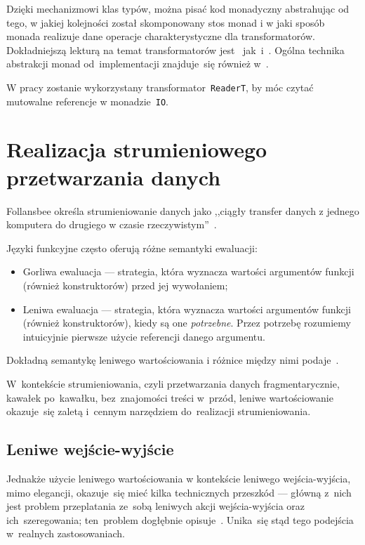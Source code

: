 \documentclass[../../praca.tex]{subfiles}
\begin{document}
Dzięki mechanizmowi klas typów, można pisać kod monadyczny abstrahując od tego,
w jakiej kolejności został skomponowany stos monad i w jaki sposób monada
realizuje dane operacje charakterystyczne dla transformatorów. 
Dokładniejszą lekturą na temat transformatorów jest~\cite{Grabmuller:MTSS}
jak~i~\cite{Jones:FPO}. Ogólna technika abstrakcji monad od~implementacji
znajduje~się również w~\cite{OSullivan:RWH}.

W pracy zostanie wykorzystany transformator~\texttt{ReaderT}, by móc czytać 
mutowalne referencje w monadzie~\texttt{IO}.

\section{Realizacja strumieniowego przetwarzania danych}

Follansbee określa strumieniowanie danych jako ,,ciągły transfer danych
z jednego komputera do drugiego w czasie rzeczywistym''~\cite{Fallensbee:HGSM}.

Języki funkcyjne często oferują różne semantyki ewaluacji:
\begin{itemize}
  \item Gorliwa ewaluacja --- strategia, która wyznacza wartości argumentów
    funkcji (również konstruktorów) przed jej wywołaniem;
  \item Leniwa ewaluacja --- strategia, która wyznacza wartości argumentów
    funkcji (również konstruktorów), kiedy są one \emph{potrzebne}.
    Przez potrzebę rozumiemy intuicyjnie pierwsze użycie referencji
    danego argumentu.
\end{itemize}
Dokładną semantykę leniwego wartościowania i różnice między nimi podaje~\cite{Hudak:Conception}.

W~kontekście strumieniowania, czyli przetwarzania danych fragmentarycznie,
kawałek po~kawałku, bez~znajomości treści w~przód, leniwe wartościowanie okazuje~się
zaletą i~cennym narzędziem do~realizacji strumieniowania.

\subsection{Leniwe wejście-wyjście}

Jednakże użycie leniwego wartościowania w kontekście leniwego wejścia-wyjścia,
mimo elegancji, okazuje~się mieć kilka technicznych przeszkód --- główną z~nich
jest problem przeplatania ze~sobą leniwych akcji wejścia-wyjścia oraz ich~szeregowania;
ten~problem dogłębnie opisuje~\cite{Thomasson:HHPP}. Unika~się stąd tego podejścia
w~realnych zastosowaniach.
\end{document}
